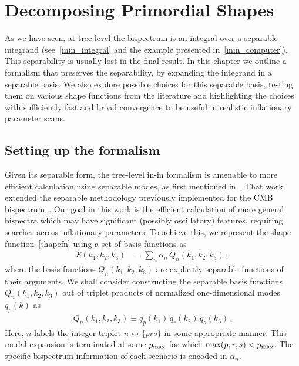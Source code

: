 %
\chapter{Decomposing Primordial Shapes}\label{chapter:decomp}
As we have seen, at tree level the bispectrum is an integral
over a separable integrand (see~\eqref{inin_integral} and
the example presented in~\eqref{inin_computer}).
This separability is usually lost
in the final result. In this chapter we outline a formalism that preserves the
separability, by expanding the integrand in a separable basis. We also explore
possible choices for this separable basis, testing them on various
shape functions from the literature and highlighting the choices with
sufficiently fast and broad convergence to be useful in realistic
inflationary parameter scans.


\section{Setting up the formalism}\label{sec:setting_notation}
Given its separable form, the tree-level in-in formalism is amenable
to more efficient calculation using separable modes, as first mentioned in~\cite{Funakoshi}.
That work extended the separable methodology previously implemented for the CMB
bispectrum~\cite{FergShell_1,FergShell_2,FergShell_3}.
Our goal in this work is the efficient calculation of more general bispectra
which may have significant (possibly oscillatory) features, requiring searches across inflationary parameters.
To achieve this, we represent the shape function~\eqref{shapefn} using a set of basis functions as
\begin{align}\label{goal}
S(k_1, k_2,k_3) &= \sum_n \alpha_n  \, Q_n(k_1,k_2,k_3)\,,
\end{align}
where the basis functions $Q_n(k_1,k_2,k_3)$ are explicitly separable functions of their arguments.
We shall consider constructing the separable basis functions $Q_n(k_1,k_2,k_3)$
out of triplet products of normalized one-dimensional modes $q_p(k)$ as
\begin{align}\label{modes3d}
    Q_n(k_1,k_2,k_3)\equiv q_{p} (k_1) \, q_{r}(k_2)\, q_{s}(k_3)\,.
\end{align}
Here, $n$ labels the integer triplet $n \leftrightarrow \{p r s\}$ in some appropriate manner.
This modal expansion is terminated at some $p_\text{max}$ for which $\text{max}(p,r,s)<p_\text{max}$.
The specific bispectrum information of each scenario is encoded in $\alpha_n$.


